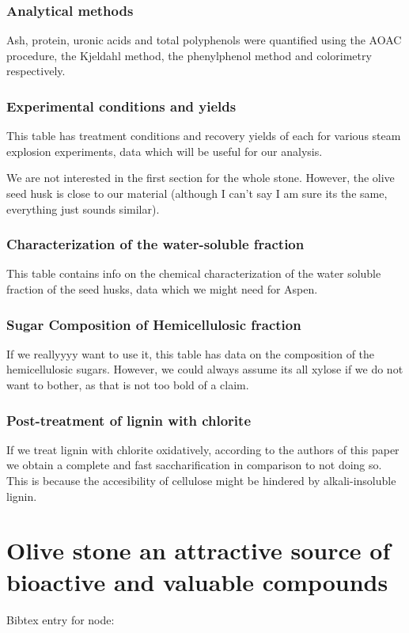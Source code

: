 \documentclass[11pt]{article}
\begin{document}
\subsubsection{Analytical methods}
\label{sec:orgc0e6799}
Ash, protein, uronic acids and total polyphenols were quantified using the AOAC procedure, the Kjeldahl method, the phenylphenol method and colorimetry respectively.
\subsubsection{Experimental conditions and yields}
\label{sec:orgf4ea00a}
This table has treatment conditions and recovery yields of each for various steam explosion experiments, data which will be useful for our analysis.

We are not interested in the first section for the whole stone. However, the olive seed husk is close to our material (although I can't say I am sure its the same, everything just sounds similar).
\subsubsection{Characterization of the water-soluble fraction}
\label{sec:org12018d9}
This table contains info on the chemical characterization of the water soluble fraction of the seed husks, data which we might need for Aspen.
\subsubsection{Sugar Composition of Hemicellulosic fraction}
\label{sec:org12148bd}
If we reallyyyy want to use it, this table has data on the composition of the hemicellulosic sugars. However, we could always assume its all xylose if we do not want to bother, as that is not too bold of a claim.
\subsubsection{Post-treatment of lignin with chlorite}
\label{sec:org2b7c495}
If we treat lignin with chlorite oxidatively, according to the authors of this paper we obtain a complete and fast saccharification in comparison to not doing so. This is because the accesibility of cellulose might be hindered by alkali-insoluble lignin.

\section{Olive stone an attractive source of bioactive and valuable compounds}
\label{sec:org17aa79b}
Bibtex entry for node: \cite{rodriguezOliveStoneAttractive2008}
\end{document}
